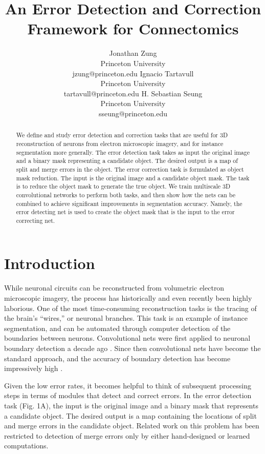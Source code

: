 \documentclass{article}
\title{An Error Detection and Correction Framework for Connectomics}
\author{
	Jonathan Zung\\
	Princeton University\\
	jzung@princeton.edu
	\And
	Ignacio Tartavull\\
	Princeton University\\
	tartavull@princeton.edu
	\And
	H. Sebastian Seung\\
	Princeton University\\
	sseung@princeton.edu
	\And
}
\begin{document}
\maketitle

\begin{abstract}
We define and study error detection and correction tasks that are
useful for 3D reconstruction of neurons from electron microscopic
imagery, and for instance segmentation more generally.  The error
detection task takes as input the original image and a binary mask
representing a candidate object. The desired output is a map of split
and merge errors in the object. The error correction task is
formulated as object mask reduction. The input is the original image
and a candidate object mask. The task is to reduce the object mask to
generate the true object. We train multiscale 3D convolutional
networks to perform both tasks, and then show how the nets can be
combined to achieve significant improvements in segmentation
accuracy. Namely, the error detecting net is used to create the
object mask that is the input to the error correcting net.
\end{abstract}

\section{Introduction}
While neuronal circuits can be reconstructed from volumetric electron
microscopic imagery, the process has historically
\cite{white1986structure} and even recently \cite{schmidt2017axonal}
been highly laborious. One of the most time-consuming reconstruction
tasks is the tracing of the brain's ``wires,'' or neuronal branches.
This task is an example of instance segmentation, and can be automated through computer detection of the boundaries between neurons. Convolutional nets were first applied to neuronal boundary detection a decade ago \cite{boundary_detection, jain2007supervised}.
Since then convolutional nets have become the standard approach, and
the accuracy of boundary detection has become impressively high  \cite{li2017deep, beier2017multicut, kisuk, funke2017deep}.

Given the low error rates, it becomes helpful to think of subsequent processing steps in terms of modules that detect and correct errors. In the error detection task (Fig. 1A), the input is the original image and a binary mask that represents a candidate object. The desired output is a map containing the locations of split and merge errors in the candidate object. Related work on this problem has been restricted to detection of merge errors only by either hand-designed \cite{multipass} or learned \cite{mergenet} computations.
\end{document}
